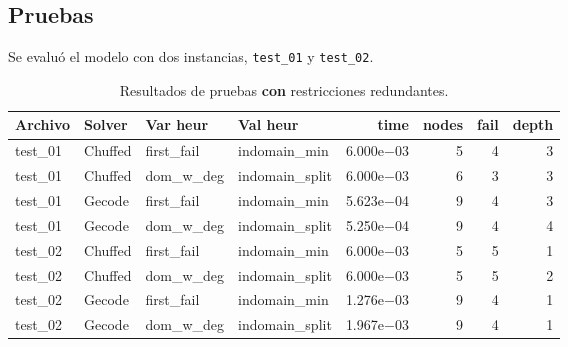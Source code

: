 
\subsection{Pruebas}\label{sec:02-kakuro-pruebas}
Se evaluó el modelo con dos instancias, \texttt{test\_01} y \texttt{test\_02}.

\begin{compactfloats}
\begin{table}[H]
  \centering
  \small
  \setlength{\tabcolsep}{10.8pt}
  \caption{Resultados de pruebas \textbf{con} restricciones redundantes.}
  \label{tab:pruebas-kakuro-on}
  \begin{tabular}{l l l l r r r r}
    \toprule
    \textbf{Archivo} & \textbf{Solver} & \textbf{Var heur} & \textbf{Val heur} & \textbf{time} & \textbf{nodes} & \textbf{fail} & \textbf{depth} \\
    \midrule
    test\_01 & Chuffed & first\_fail  & indomain\_min   & 6.000e$-$03 & 5 & 4 & 3 \\
    test\_01 & Chuffed & dom\_w\_deg  & indomain\_split & 6.000e$-$03 & 6 & 3 & 3 \\
    test\_01 & Gecode  & first\_fail  & indomain\_min   & 5.623e$-$04 & 9 & 4 & 3 \\
    test\_01 & Gecode  & dom\_w\_deg  & indomain\_split & 5.250e$-$04 & 9 & 4 & 4 \\
    \midrule
    test\_02 & Chuffed & first\_fail  & indomain\_min   & 6.000e$-$03 & 5 & 5 & 1 \\
    test\_02 & Chuffed & dom\_w\_deg  & indomain\_split & 6.000e$-$03 & 5 & 5 & 2 \\
    test\_02 & Gecode  & first\_fail  & indomain\_min   & 1.276e$-$03 & 9 & 4 & 1 \\
    test\_02 & Gecode  & dom\_w\_deg  & indomain\_split & 1.967e$-$03 & 9 & 4 & 1 \\
    \bottomrule
  \end{tabular}
\end{table}


\end{compactfloats}
